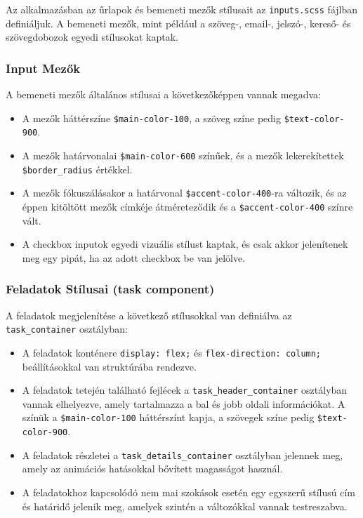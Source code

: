 \documentclass[12pt]{report}
\begin{document}
Az alkalmazásban az űrlapok és bemeneti mezők stílusait az \texttt{inputs.scss} fájlban definiáljuk. A bemeneti mezők, mint például a szöveg-, email-, jelszó-, kereső- és szövegdobozok egyedi stílusokat kaptak.

\subsubsection{Input Mezők}
A bemeneti mezők általános stílusai a következőképpen vannak megadva:

\begin{itemize}
    \item A mezők háttérszíne \texttt{\$main-color-100}, a szöveg színe pedig \texttt{\$text-color-900}.
    \item A mezők határvonalai \texttt{\$main-color-600} színűek, és a mezők lekerekítettek \texttt{\$border\_radius} értékkel.
    \item A mezők fókuszálásakor a határvonal \texttt{\$accent-color-400}-ra változik, és az éppen kitöltött mezők címkéje átméreteződik és a \texttt{\$accent-color-400} színre vált.
    \item A checkbox inputok egyedi vizuális stílust kaptak, és csak akkor jelenítenek meg egy pipát, ha az adott checkbox be van jelölve.
\end{itemize}

\subsubsection{Feladatok Stílusai (task component)}
A feladatok megjelenítése a következő stílusokkal van definiálva az \texttt{task\_container} osztályban:

\begin{itemize}
    \item A feladatok konténere \texttt{display: flex;} és \texttt{flex-direction: column;} beállításokkal van struktúrába rendezve.
    \item A feladatok tetején található fejlécek a \texttt{task\_header\_container} osztályban vannak elhelyezve, amely tartalmazza a bal és jobb oldali információkat. A színük a \texttt{\$main-color-100} háttérszínt kapja, a szövegek színe pedig \texttt{\$text-color-900}.
    \item A feladatok részletei a \texttt{task\_details\_container} osztályban jelennek meg, amely az animációs hatásokkal bővített magasságot használ.
    \item A feladatokhoz kapcsolódó nem mai szokások esetén egy egyszerű stílusú cím és határidő jelenik meg, amelyek szintén a változókkal vannak testreszabva.
\end{itemize}
\end{document}

